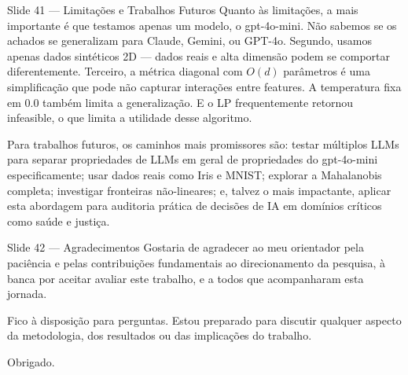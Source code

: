\documentclass[aspectratio=169,11pt]{beamer}
\begin{document}
\begin{frame}{Slide 41 --- Limitações e Trabalhos Futuros}
\small
Quanto às limitações, a mais importante é que testamos apenas um modelo, o gpt-4o-mini. Não sabemos se os achados se generalizam para Claude, Gemini, ou GPT-4o. Segundo, usamos apenas dados sintéticos 2D --- dados reais e alta dimensão podem se comportar diferentemente. Terceiro, a métrica diagonal com $O(d)$ parâmetros é uma simplificação que pode não capturar interações entre features. A temperatura fixa em 0.0 também limita a generalização. E o LP frequentemente retornou infeasible, o que limita a utilidade desse algoritmo.

Para trabalhos futuros, os caminhos mais promissores são: testar múltiplos LLMs para separar propriedades de LLMs em geral de propriedades do gpt-4o-mini especificamente; usar dados reais como Iris e MNIST; explorar a Mahalanobis completa; investigar fronteiras não-lineares; e, talvez o mais impactante, aplicar esta abordagem para auditoria prática de decisões de IA em domínios críticos como saúde e justiça.
\end{frame}

\begin{frame}{Slide 42 --- Agradecimentos}
\small
Gostaria de agradecer ao meu orientador pela paciência e pelas contribuições fundamentais ao direcionamento da pesquisa, à banca por aceitar avaliar este trabalho, e a todos que acompanharam esta jornada.

Fico à disposição para perguntas. Estou preparado para discutir qualquer aspecto da metodologia, dos resultados ou das implicações do trabalho.

Obrigado.
\end{frame}
\end{document}
